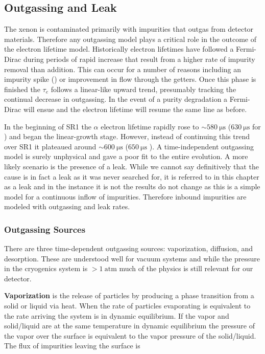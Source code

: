 \subsection{Outgassing and Leak}
\label{subsec:electron_lifetime_model_outgassing}
The xenon is contaminated primarily with impurities that outgas from detector materials.  Therefore any outgassing model plays a
critical role in the outcome of the electron lifetime model.  Historically electron lifetimes have followed a Fermi-Dirac during periods
of rapid increase that result from a higher rate of impurity
removal than addition.  This can occur for a number of reasons including an impurity spike
() or improvement in flow through the getters.  Once this phase is
finished the $\tau_e$ follows a linear-like upward trend, presumably tracking the continual decrease in outgassing.  In the event of a
purity degradation a Fermi-Dirac will ensue and the electron lifetime will resume the same line as before.

In the beginning of SR1 the $\alpha$ electron lifetime rapidly rose to ${\sim} 580\ \mathrm{\mu s}$ ($630\ \mathrm{\mu s}$ for \metakr)
and began the linear-growth stage.  However, instead of continuing this trend over SR1
it plateaued around ${\sim} 600\ \mathrm{\mu s}$ ($650\ \mathrm{\mu s}$ \metakr).  A time-independent outgassing model is surely
unphysical and
gave a poor fit to the entire evolution.  A more likely scenario is the presence of a leak.  While we cannot say definitively that the
cause is in fact a leak as it was never searched for, it is referred to in this chapter as a leak and in the instance it is not the
results do not change as this is a simple model for a continuous inflow of impurities.  Therefore inbound impurities are modeled with
outgassing and leak rates.



\subsubsection{Outgassing Sources}
\label{subsubsec:electron_lifetime_model_outgassing_sources}
There are three time-dependent outgassing sources: vaporization, diffusion, and desorption.  These are understood well for vacuum systems
and while the pressure in the cryogenics system is $> 1\ \mathrm{atm}$ much of the physics is still relevant for our detector.

\textbf{Vaporization} is the release of particles by producing a phase transition from a solid or liquid via heat.  When the rate of
particles evaporating is equivalent to the rate arriving the system is in dynamic equilibrium.  If the vapor and solid/liquid are at the
same temperature in dynamic equilibrium the pressure of the vapor over the surface is equivalent to the vapor pressure of the
solid/liquid.  The flux of impurities leaving the surface is

